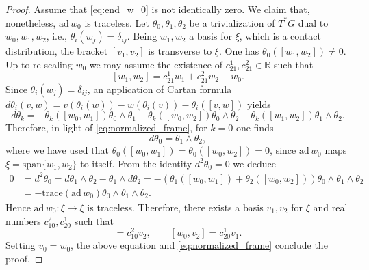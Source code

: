 \documentclass[reqno]{amsart}
\theoremstyle{remark}
\theoremstyle{plain}
\begin{document}
\begin{proof}
    Assume that \eqref{eq:end_w_0} is not identically zero. We claim that, nonetheless, $\mathrm{ad}\,w_0$ is traceless. Let $\theta_0,\theta_1,\theta_2$ be a trivialization of $T^*G$ dual to $w_0,w_1,w_2$, i.e., $\theta_i(w_j)=\delta_{ij}$. Being $w_1,w_2$ a basis for $\xi$, which is a contact distribution, the bracket $[v_1,v_2]$ is transverse to $\xi$. One has $\theta_0([w_1,w_2])\neq 0$. Up to re-scaling $w_0$ we may assume the existence of $c_{21}^1,c_{21}^2\in\mathbb R$ such that 
 	\begin{equation}\label{eq:normalized_frame}
 		[w_1,w_2]=c_{21}^1w_1+c_{21}^2w_2-w_0.
 	\end{equation}
 	Since $\theta_i(w_j)=\delta_{ij}$, an application of Cartan formula $d\theta_i(v,w)=v(\theta_i(w))-w(\theta_i(v))-\theta_i([v,w])$ yields
 	\begin{equation}
 		d\theta_k=-\theta_{k}([w_0,w_1])\theta_0\wedge\theta_1-\theta_{k}([w_0,w_2])\theta_0\wedge\theta_2-\theta_{k}([w_1,w_2])\theta_1\wedge\theta_2.
 	\end{equation}
 	Therefore, in light of \eqref{eq:normalized_frame}, for $k=0$ one finds 
 	\begin{equation}
 		d\theta_0=\theta_1\wedge \theta_2,
 	\end{equation}
 	where we have used that $\theta_0([w_0,w_1])=\theta_0([w_0,w_2])=0$, since $\mathrm{ad}\,w_0$ maps $\xi=\mathrm{span}\{w_1,w_2\}$ to itself.
 	From the identity $d^2\theta_0=0$ we deduce
 	\begin{equation}
 		\begin{aligned}
 			0&=d^2\theta_0
 			=d\theta_1\wedge\theta_2-\theta_1\wedge d\theta_2=-(\theta_1([w_0,w_1])+\theta_2([w_0,w_2]))\theta_0\wedge \theta_1\wedge \theta_2\\
 			&=-\mathrm{trace}(\mathrm{ad}\,w_0)\theta_0\wedge \theta_1\wedge \theta_2.
 		\end{aligned}
 	\end{equation}
 	Hence $\mathrm{ad}\,w_0:\xi\to \xi$ is traceless. Therefore, there exists a basis $v_1,v_2$ for $\xi$ and real numbers $c_{10}^2, c_{20}^1$ such that 
 	\begin{equation}
 		[w_0,v_1]=c_{10}^2v_2,\qquad [w_0,v_2]=c_{20}^1v_1.
 	\end{equation} 
 	Setting $v_0=w_0$, the above equation and \eqref{eq:normalized_frame} conclude the proof.

\end{proof}
\end{document}
